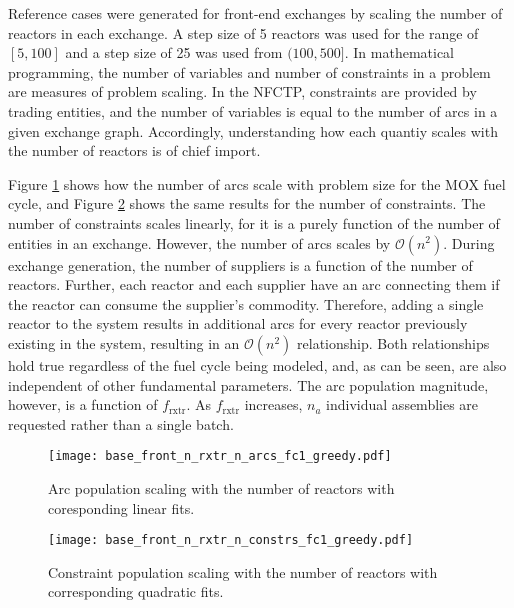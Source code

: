 Reference cases were generated for front-end exchanges by scaling the number of
reactors in each exchange. A step size of 5 reactors was used for the range of
$[5, 100]$ and a step size of 25 was used from $(100, 500]$. In mathematical
  programming, the number of variables and number of constraints in a problem
  are measures of problem scaling. In the NFCTP, constraints are provided by
  trading entities, and the number of variables is equal to the number of arcs
  in a given exchange graph. Accordingly, understanding how each quantiy scales
  with the number of reactors is of chief import.

Figure \ref{fig:base_front_n_rxtr_n_arcs_fc1_greedy} shows how the number
of arcs scale with problem size for the MOX fuel cycle, and Figure
\ref{fig:base_front_n_rxtr_n_constrs_fc1_greedy} shows the same results
for the number of constraints. The number of constraints scales linearly, for it
is a purely function of the number of entities in an exchange. However, the
number of arcs scales by $\mathcal{O}(n^2)$. During exchange generation, the
number of suppliers is a function of the number of reactors. Further, each
reactor and each supplier have an arc connecting them if the reactor can consume
the supplier's commodity. Therefore, adding a single reactor to the system
results in additional arcs for every reactor previously existing in the system,
resulting in an $\mathcal{O}(n^2)$ relationship. Both relationships hold true
regardless of the fuel cycle being modeled, and, as can be seen, are also
independent of other fundamental parameters. The arc population magnitude,
however, is a function of $f_\text{rxtr}$. As $f_\text{rxtr}$ increases, $n_a$
individual assemblies are requested rather than a single batch.

\begin{figure}[h!]
  \begin{center}
    \texttt{[image: base\_front\_n\_rxtr\_n\_arcs\_fc1\_greedy.pdf]}
    \caption[]{
      \label{fig:base_front_n_rxtr_n_arcs_fc1_greedy}
      Arc population scaling with the number of reactors with coresponding linear fits.}
  \end{center}
\end{figure}

\begin{figure}[h!]
  \begin{center}
    \texttt{[image: base\_front\_n\_rxtr\_n\_constrs\_fc1\_greedy.pdf]}
    \caption[]{
      \label{fig:base_front_n_rxtr_n_constrs_fc1_greedy}
      Constraint population scaling with the number of reactors with
      corresponding quadratic fits.}
  \end{center}
\end{figure}


